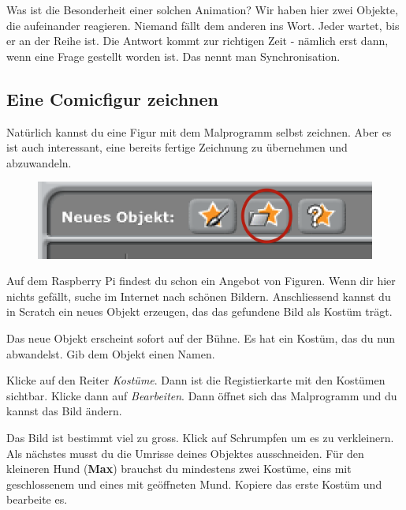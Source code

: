 \documentclass[12pt,a4paper,titlepage]{article}
\begin{document}
Was ist die Besonderheit einer solchen Animation? Wir haben hier zwei Objekte, die aufeinander reagieren. Niemand fällt dem anderen ins Wort. Jeder wartet, bis er an der Reihe ist. Die Antwort kommt zur richtigen Zeit - nämlich erst dann, wenn eine Frage gestellt worden ist. Das nennt man Synchronisation.

\subsection{Eine Comicfigur zeichnen}

Natürlich kannst du eine Figur mit dem Malprogramm selbst zeichnen. Aber es ist auch interessant, eine bereits fertige Zeichnung zu übernehmen und abzuwandeln.

\begin{figure}
  \vspace{-29pt}
  \begin{center}
    \includegraphics[scale=0.6]{importieren.png}
  \end{center}
  \vspace{-15pt}
\end{figure}

Auf dem Raspberry Pi findest du schon ein Angebot von Figuren. Wenn dir hier nichts gefällt, suche im Internet nach schönen Bildern. Anschliessend kannst du in Scratch ein neues Objekt erzeugen, das das gefundene Bild als Kostüm trägt. 

Das neue Objekt erscheint sofort auf der Bühne. Es hat ein Kostüm, das du nun abwandelst. Gib dem Objekt einen Namen.

Klicke auf den Reiter \textit{Kostüme}. Dann ist die Registierkarte mit den Kostümen sichtbar. Klicke dann auf \textit{Bearbeiten}. Dann öffnet sich das Malprogramm und du kannst das Bild ändern.

Das Bild ist bestimmt viel zu gross. Klick auf Schrumpfen um es zu verkleinern. Als nächstes musst du die Umrisse deines Objektes ausschneiden. Für den kleineren Hund (\textbf{Max}) brauchst du mindestens zwei Kostüme, eins mit geschlossenem und eines mit geöffneten Mund. Kopiere das erste Kostüm und bearbeite es.
\end{document}
